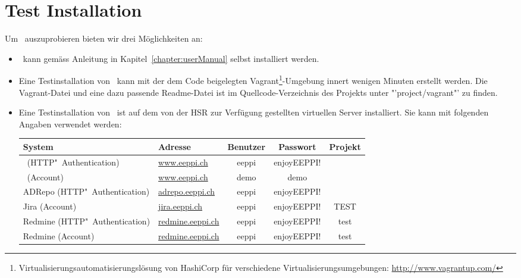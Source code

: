 \chapter{Test Installation}
Um \eeppi\ auszuprobieren bieten wir drei Möglichkeiten an:
\begin{itemize}
	\item \eeppi\ kann gemäss Anleitung in Kapitel\ \ref{chapter:userManual} selbst installiert werden.
	\item Eine Testinstallation von \eeppi\ kann mit der dem Code beigelegten Vagrant\footnote{Virtualisierungsautomatisierungslösung von HashiCorp für verschiedene Virtualisierungsumgebungen: \url{http://www.vagrantup.com/}}-Umgebung innert wenigen Minuten erstellt werden.
	Die Vagrant-Datei und eine dazu passende Readme-Datei ist im Quellcode-Verzeichnis des Projekts unter "'project/vagrant"' zu finden.
	\item Eine Testinstallation von \eeppi\ ist auf dem von der HSR zur Verfügung gestellten virtuellen Server installiert.
	Sie kann mit folgenden Angaben verwendet werden: \newline
	\begin{tabularx}{\linewidth}{| X | l | c | c | c |}
	\hline
	\textbf{System} & \textbf{Adresse} & \textbf{Benutzer} & \textbf{Passwort} & \textbf{Projekt} \\ \hline \hline
	
	\eeppi\ (HTTP"~Authentication) &
		\href{http://eeppi:enjoyEEPPI!@www.eeppi.ch}{www.eeppi.ch} &
		eeppi & enjoyEEPPI! & \\ \hline
	
	\eeppi\ (Account) &
		\href{http://eeppi:enjoyEEPPI!@www.eeppi.ch}{www.eeppi.ch} &
		demo & demo & \\ \hline
	
	ADRepo (HTTP"~Authentication) &
		\href{http://eeppi:enjoyEEPPI!@adrepo.eeppi.ch}{adrepo.eeppi.ch} &
		eeppi & enjoyEEPPI! & \\ \hline
	
	Jira (Account) &
		\href{http://jira.eeppi.ch}{jira.eeppi.ch} &
		eeppi & enjoyEEPPI! & TEST \\ \hline
	
	Redmine (HTTP"~Authentication) &
		\href{http://eeppi:enjoyEEPPI!@redmine.eeppi.ch}{redmine.eeppi.ch} &
		eeppi & enjoyEEPPI! & test \\ \hline
	
	Redmine (Account) &
		\href{http://eeppi:enjoyEEPPI!@redmine.eeppi.ch}{redmine.eeppi.ch} &
		eeppi & enjoyEEPPI! & test \\ \hline
	\end{tabularx}
\end{itemize}
